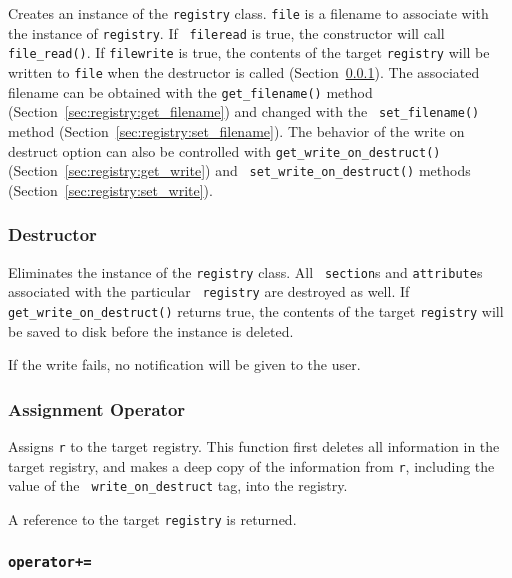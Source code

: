
Creates an instance of the {\tt registry} class.  {\tt file} is a
filename to associate with the instance of {\tt registry}.  If {\tt
  fileread} is true, the constructor will call {\tt file\_read()}.  If
{\tt filewrite} is true, the contents of the target {\tt registry}
will be written to {\tt file} when the destructor is called
(Section~\ref{sec:registry:dest}).  The associated filename can be
obtained with the {\tt get\_filename()} method
(Section~\ref{sec:registry:get_filename}) and changed with the {\tt
  set\_filename()} method (Section~\ref{sec:registry:set_filename}).
The behavior of the write on destruct option can also be controlled
with {\tt get\_write\_on\_destruct()}
(Section~\ref{sec:registry:get_write}) and {\tt
  set\_write\_on\_destruct()} methods
(Section~\ref{sec:registry:set_write}).

\subsubsection{Destructor}
\label{sec:registry:dest}


Eliminates the instance of the {\tt registry} class.  All {\tt
section}s and {\tt attribute}s associated with the particular {\tt
registry} are destroyed as well.  If {\tt get\_write\_on\_destruct()}
returns true, the contents of the target {\tt registry} will be saved
to disk before the instance is deleted.

If the write fails, no notification will be given to the user.


\subsubsection{Assignment Operator}
        

Assigns {\tt r} to the target registry.  This function first deletes
all information in the target registry, and makes a deep copy of the
information from {\tt r}, including the value of the {\tt
write\_on\_destruct} tag, into the registry.  

A reference to the target {\tt registry} is returned.


\subsubsection[operator+=]{{\tt operator+=}}
\label{code:reg:op_pl_eq}

